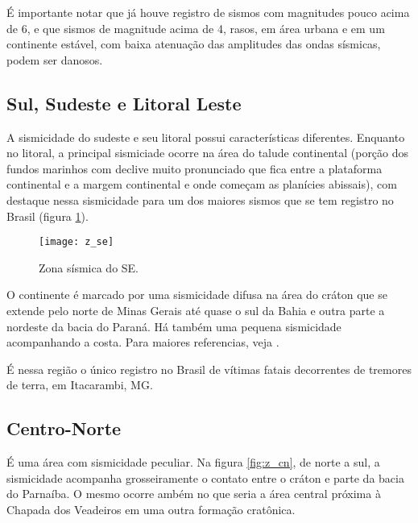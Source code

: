 É importante notar que já houve registro de sismos com magnitudes pouco acima de 6,
e que sismos de magnitude acima de 4, rasos, em área urbana e em um continente estável,
com baixa atenuação das amplitudes das ondas sísmicas, podem ser danosos.


\subsection{Sul, Sudeste e Litoral Leste}
\label{sec:z_se}

A sismicidade do sudeste e seu litoral possui características diferentes.
Enquanto no litoral, a principal sismiciade ocorre na área do talude continental
(porção dos fundos marinhos com declive muito pronunciado que fica entre a plataforma continental e
a margem continental e onde começam as planícies abissais), com destaque nessa sismicidade para um dos maiores sismos
que se tem registro no Brasil (figura \ref{fig:z_se}).

\begin{figure}[H]
  \centering
  \texttt{[image: z\_se]} 
  \caption{Zona sísmica do SE. \citet{dourado_2014}}
  \label{fig:z_se} 
\end{figure}

O continente é marcado por uma sismicidade difusa na área do cráton que se extende pelo norte de Minas
Gerais até quase o sul da Bahia e outra parte a nordeste da bacia do Paraná. 
Há também uma pequena sismicidade acompanhando a costa. Para maiores referencias, veja 
\citet{assumpcao_2004}.

É nessa região o único registro no Brasil de vítimas fatais decorrentes de tremores de terra, em Itacarambi, MG.

\subsection{Centro-Norte}
\label{sec:z_cn}

É uma área com sismicidade peculiar. Na figura \ref{fig:z_cn}, de norte a sul, a sismicidade acompanha grosseiramente o
contato entre o cráton e parte da bacia do Parnaíba. O mesmo ocorre ambém no que seria a 
área central próxima à Chapada dos Veadeiros em uma outra formação cratônica.

